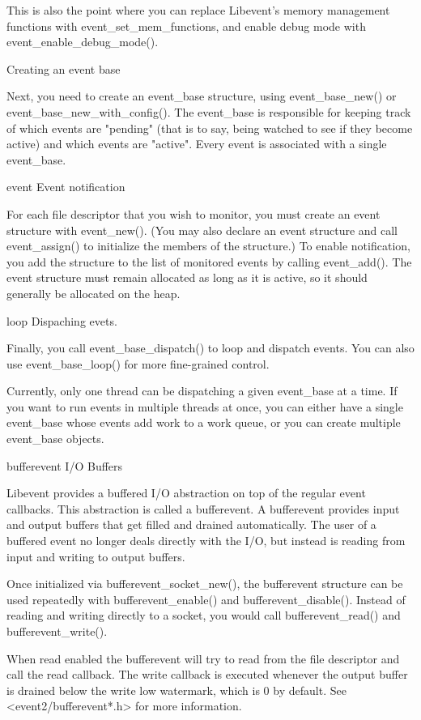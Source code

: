 \documentclass[11pt,a4paper]{article}
\begin{document}
This is also the point where you can replace Libevent's memory management functions with event\_set\_mem\_functions, and enable debug mode with event\_enable\_debug\_mode().

Creating an event base

Next, you need to create an event\_base structure, using event\_base\_new() or event\_base\_new\_with\_config().  The event\_base is responsible for keeping track of which events are "pending" (that is to say, being watched to see if they become active) and which events are "active". Every event is associated with a single event\_base.

event Event notification

For each file descriptor that you wish to monitor, you must create an event structure with event\_new().  (You may also declare an event structure and call event\_assign() to initialize the members of the structure.)  To enable notification, you add the structure to the list of monitored events by calling event\_add().  The event structure must remain allocated as long as it is active, so it should generally be allocated on the heap.

loop Dispaching evets.

Finally, you call event\_base\_dispatch() to loop and dispatch events. You can also use event\_base\_loop() for more fine-grained control.

Currently, only one thread can be dispatching a given event\_base at a time.  If you want to run events in multiple threads at once, you can either have a single event\_base whose events add work to a work queue, or you can create multiple event\_base objects.

bufferevent I/O Buffers

Libevent provides a buffered I/O abstraction on top of the regular event callbacks. This abstraction is called a bufferevent. A bufferevent provides input and output buffers that get filled and drained automatically. The user of a buffered event no longer deals directly with the I/O, but instead is reading from input and writing to output buffers.

Once initialized via bufferevent\_socket\_new(), the bufferevent structure can be used repeatedly with bufferevent\_enable() and bufferevent\_disable().  Instead of reading and writing directly to a socket, you would call bufferevent\_read() and bufferevent\_write().

When read enabled the bufferevent will try to read from the file descriptor and call the read callback. The write callback is executed whenever the output buffer is drained below the write low watermark, which is 0 by default.
See <event2/bufferevent*.h> for more information.
\end{document}
